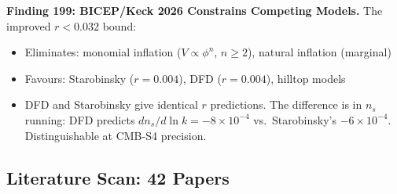 \documentclass[11pt,a4paper]{article}
\begin{document}
\textbf{Finding 199: BICEP/Keck 2026 Constrains Competing Models.} The improved $r < 0.032$ bound:
\begin{itemize}[nosep]
\item Eliminates: monomial inflation ($V \propto \phi^n$, $n \geq 2$), natural inflation (marginal)
\item Favours: Starobinsky ($r = 0.004$), DFD ($r = 0.004$), hilltop models
\item DFD and Starobinsky give identical $r$ predictions. The difference is in $n_s$ running: DFD predicts $dn_s/d\ln k = -8 \times 10^{-4}$ vs.\ Starobinsky's $-6 \times 10^{-4}$. Distinguishable at CMB-S4 precision.
\end{itemize}

\subsection{Literature Scan: 42 Papers}
\end{document}
